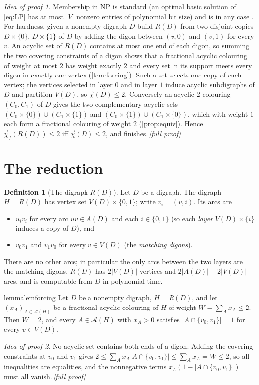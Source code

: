 \documentclass[11pt,a4paper]{article}
\theoremstyle{plain}
\theoremstyle{definition}
\newtheorem{definition}[theorem]{Definition}
\theoremstyle{remark}
\newtheorem*{proofidea}{Idea of proof}
\newcommand{\fullproofref}[1]{\,\hyperref[#1]{\textit{[full proof]}}}
\newcommand{\fdc}{\vec{\chi}_{f}}
\newcommand{\dic}{\vec{\chi}}
\newcommand{\cA}{\mathcal A}
\begin{document}
\begin{proofidea}
Membership in NP is standard (an optimal basic solution of \eqref{eq:LP} has at most $|V|$ nonzero entries of polynomial bit size) and is in any case \cite[Observation~3.15]{HSS20}. For hardness, given a nonempty digraph $D$ build $R(D)$ from two disjoint copies $D\times\{0\}$, $D\times\{1\}$ of $D$ by adding the digon between $(v,0)$ and $(v,1)$ for every $v$. An acyclic set of $R(D)$ contains at most one end of each digon, so summing the two covering constraints of a digon shows that a fractional acyclic colouring of weight at most $2$ has weight exactly $2$ and every set in its support meets every digon in exactly one vertex (\cref{lem:forcing}). Such a set selects one copy of each vertex; the vertices selected in layer $0$ and in layer $1$ induce acyclic subdigraphs of $D$ and partition $V(D)$, so $\dic(D)\le2$. Conversely an acyclic $2$-colouring $(C_0,C_1)$ of $D$ gives the two complementary acyclic sets $(C_0\times\{0\})\cup(C_1\times\{1\})$ and $(C_0\times\{1\})\cup(C_1\times\{0\})$, which with weight $1$ each form a fractional colouring of weight $2$ (\cref{prop:equiv}). Hence $\fdc(R(D))\le2$ iff $\dic(D)\le2$, and \cite{BFJKM04} finishes.\fullproofref{pf:main}
\end{proofidea}

\section{The reduction}\label{sec:reduction}

\begin{definition}[The digraph $R(D)$]\label{def:R}
Let $D$ be a digraph. The digraph $H=R(D)$ has vertex set $V(D)\times\{0,1\}$; write $v_i=(v,i)$. Its arcs are
\begin{itemize}[nosep]
\item $u_iv_i$ for every arc $uv\in A(D)$ and each $i\in\{0,1\}$ (so each \emph{layer} $V(D)\times\{i\}$ induces a copy of $D$), and
\item $v_0v_1$ and $v_1v_0$ for every $v\in V(D)$ (the \emph{matching digons}).
\end{itemize}
There are no other arcs; in particular the only arcs between the two layers are the matching digons. $R(D)$ has $2|V(D)|$ vertices and $2|A(D)|+2|V(D)|$ arcs, and is computable from $D$ in polynomial time.
\end{definition}

\begin{restatable}{lemma}{lemforcing}\label{lem:forcing}
Let $D$ be a nonempty digraph, $H=R(D)$, and let $(x_A)_{A\in\cA(H)}$ be a fractional acyclic colouring of $H$ of weight $W=\sum_Ax_A\le2$. Then $W=2$, and every $A\in\cA(H)$ with $x_A>0$ satisfies $|A\cap\{v_0,v_1\}|=1$ for every $v\in V(D)$.
\end{restatable}
\begin{proofidea}
No acyclic set contains both ends of a digon. Adding the covering constraints at $v_0$ and $v_1$ gives $2\le\sum_Ax_A|A\cap\{v_0,v_1\}|\le\sum_Ax_A=W\le2$, so all inequalities are equalities, and the nonnegative terms $x_A(1-|A\cap\{v_0,v_1\}|)$ must all vanish.\fullproofref{pf:forcing}
\end{proofidea}
\end{document}
